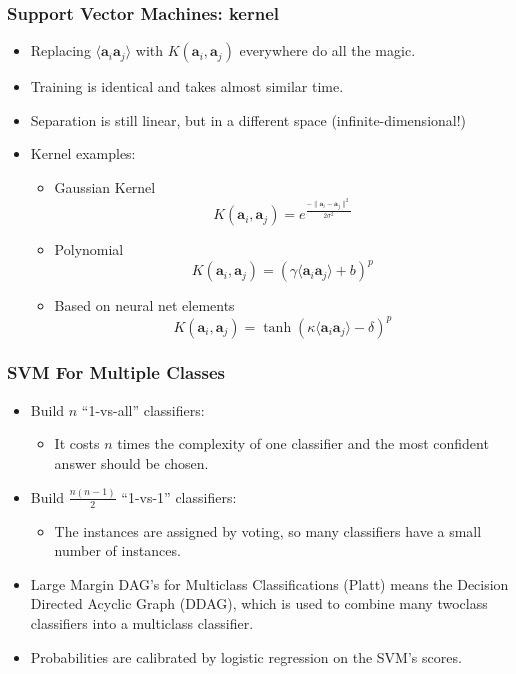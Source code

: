 \documentclass[proffesionalfonts]{beamer}
\begin{document}
\begin{frame}\frametitle{Support Vector Machines: kernel}
  \begin{itemize}
  \item Replacing $\langle\mathbf a_i \mathbf a_j\rangle$ with  $K(\mathbf a_i, \mathbf a_j)$ everywhere do all the magic.
  \item Training is identical and takes almost similar time.
  \item Separation is still linear, but in a different space (infinite-dimensional!)
  \item Kernel examples:
  \begin{itemize}
  \item Gaussian Kernel
\setcounter{equation}{0}
    \begin{equation}
      K(\mathbf a_i, \mathbf a_j) = e^\frac{-\|\mathbf a_i - \mathbf a_j\|^2}{2\sigma^2}
    \end{equation}
  \item Polynomial
    \begin{equation}
      K(\mathbf a_i, \mathbf a_j) = (\gamma\langle\mathbf a_i \mathbf a_j\rangle + b)^p
    \end{equation}
  \item Based on neural net elements
    \begin{equation}
      K(\mathbf a_i, \mathbf a_j) = \tanh(\kappa\langle\mathbf a_i \mathbf a_j\rangle - \delta)^p
    \end{equation}
  \end{itemize}
  \end{itemize}
\end{frame}

\begin{frame}\frametitle{SVM For Multiple Classes}
  \begin{itemize}
  \item Build $n$ ``1-vs-all'' classifiers:
  \begin{itemize}
  \item It costs $n$ times the complexity of one classifier and the most confident answer should be chosen.
  \end{itemize}
  \item Build $\frac{n(n-1)}{2}$ ``1-vs-1'' classifiers:
  \begin{itemize}
    \item The instances are assigned by voting, so many classifiers have a small number of instances.
  \end{itemize}
  \item Large Margin DAG’s for Multiclass Classifications (Platt) means the Decision Directed Acyclic Graph (DDAG), which is used to combine many two­class classifiers into a multiclass classifier.
  \item Probabilities are calibrated by logistic regression on the SVM’s scores.
  \end{itemize}
\end{frame}
\end{document}
